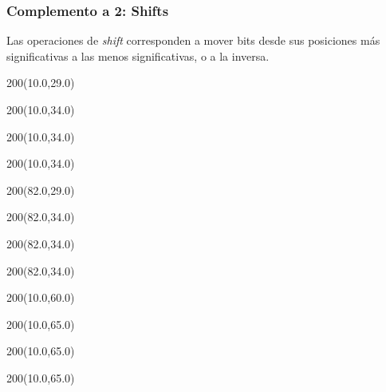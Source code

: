 \documentclass[aspectratio=169]{beamer}
\begin{document}
\begin{frame}[fragile,t]
    \frametitle{\textbf{Complemento a 2}: Shifts}
    Las operaciones de \textit{shift} corresponden a mover bits desde sus posiciones más significativas a las menos significativas, o a la inversa.
    \begin{textblock}{200}(10.0,29.0)   \end{textblock}
    \begin{textblock}{200}(10.0,34.0)   \end{textblock}
    \begin{textblock}{200}(10.0,34.0)   \end{textblock}
    \begin{textblock}{200}(10.0,34.0)   \end{textblock}
    \begin{textblock}{200}(82.0,29.0)   \end{textblock}
    \begin{textblock}{200}(82.0,34.0)   \end{textblock}
    \begin{textblock}{200}(82.0,34.0)   \end{textblock}
    \begin{textblock}{200}(82.0,34.0)   \end{textblock}
    \begin{textblock}{200}(10.0,60.0)   \end{textblock}
    \begin{textblock}{200}(10.0,65.0)   \end{textblock}
    \begin{textblock}{200}(10.0,65.0)   \end{textblock}
    \begin{textblock}{200}(10.0,65.0)   \end{textblock}
\end{frame}
\end{document}
